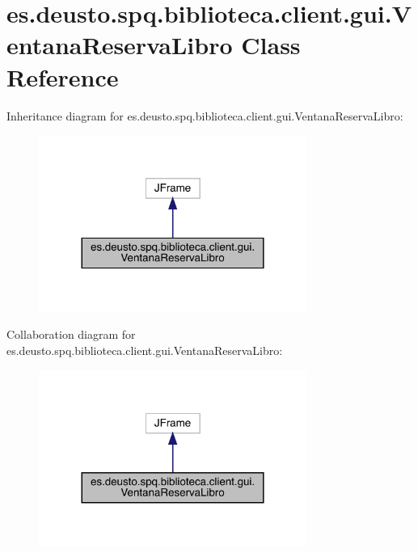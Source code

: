 \hypertarget{classes_1_1deusto_1_1spq_1_1biblioteca_1_1client_1_1gui_1_1_ventana_reserva_libro}{}\section{es.\+deusto.\+spq.\+biblioteca.\+client.\+gui.\+Ventana\+Reserva\+Libro Class Reference}
\label{classes_1_1deusto_1_1spq_1_1biblioteca_1_1client_1_1gui_1_1_ventana_reserva_libro}


Inheritance diagram for es.\+deusto.\+spq.\+biblioteca.\+client.\+gui.\+Ventana\+Reserva\+Libro\+:
\nopagebreak
\begin{figure}[H]
\begin{center}
\leavevmode
\includegraphics[width=248pt]{classes_1_1deusto_1_1spq_1_1biblioteca_1_1client_1_1gui_1_1_ventana_reserva_libro__inherit__graph}
\end{center}
\end{figure}


Collaboration diagram for es.\+deusto.\+spq.\+biblioteca.\+client.\+gui.\+Ventana\+Reserva\+Libro\+:
\nopagebreak
\begin{figure}[H]
\begin{center}
\leavevmode
\includegraphics[width=248pt]{classes_1_1deusto_1_1spq_1_1biblioteca_1_1client_1_1gui_1_1_ventana_reserva_libro__coll__graph}
\end{center}
\end{figure}

